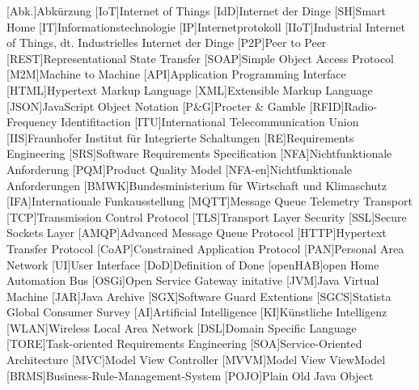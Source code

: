 \begin{acronym}[DHBW]
 [Abk.]{Abkürzung}
 [IoT]{Internet of Things}
 [IdD]{Internet der Dinge}
 [SH]{Smart Home}
 [IT]{Informationstechnologie}
 [IP]{Internetprotokoll}
 [IIoT]{Industrial Internet of Things, dt. Industrielles Internet der Dinge}
 [P2P]{Peer to Peer} 
 [REST]{Representational State Transfer}
 [SOAP]{Simple Object Access Protocol}
 [M2M]{Machine to Machine}
 [API]{Application Programming Interface}
 [HTML]{Hypertext Markup Language}
 [XML]{Extensible Markup Language}
 [JSON]{JavaScript Object Notation}
 [P\&G]{Procter \& Gamble}
 [RFID]{Radio-Frequency Identifitaction}
 [ITU]{International Telecommunication Union}
 [IIS]{Fraunhofer Institut für Integrierte Schaltungen}
 [RE]{Requirements Engineering}
 [SRS]{Software Requirements Specification}
 [NFA]{Nichtfunktionale Anforderung}
 [PQM]{Product Quality Model}
 [NFA-en]{Nichtfunktionale Anforderungen}
 [BMWK]{Bundesministerium für Wirtschaft und Klimaschutz}
 [IFA]{Internationale Funkausstellung}
 [MQTT]{Message Queue Telemetry Transport}
 [TCP]{Transmission Control Protocol}
 [TLS]{Transport Layer Security}
 [SSL]{Secure Sockets Layer}
 [AMQP]{Advanced Message Queue Protocol} 
 [HTTP]{Hypertext Transfer Protocol}
 [CoAP]{Constrained Application Protocol}
 [PAN]{Personal Area Network} 
 [UI]{User Interface}
 [DoD]{Definition of Done}
 [openHAB]{open Home Automation Bus}
 [OSGi]{Open Service Gateway initative}
 [JVM]{Java Virtual Machine}
 [JAR]{Java Archive}
 [SGX]{Software Guard Extentions}
 [SGCS]{Statista Global Consumer Survey}
 [AI]{Artificial Intelligence}
 [KI]{Künstliche Intelligenz}
 [WLAN]{Wireless Local Area Network} 
 [DSL]{Domain Specific Language}
 [TORE]{Task-oriented Requirements Engineering}
 [SOA]{Service-Oriented Architecture}
 [MVC]{Model View Controller}
 [MVVM]{Model View ViewModel}
 [BRMS]{Business-Rule-Management-System}
 [POJO]{Plain Old Java Object}


\end{acronym}
